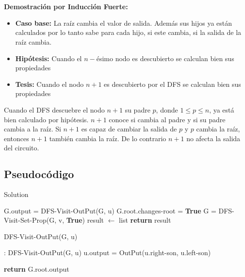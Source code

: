 \documentclass[a4paper,10pt]{article}
\begin{document}
	\\\\\textbf{Demostraci\'on por Inducci\'on Fuerte:} 
	\begin{itemize}
		\item \textbf{Caso base:} La ra\'iz cambia el valor de salida. Adem\'as sus hijos ya est\'an calculados por lo tanto sabe para cada hijo, si este cambia, si la salida  de la ra\'iz cambia.
		\item \textbf{Hip\'otesis:} Cuando el $n-$\'esimo nodo es descubierto se calculan bien sus propiedades
		\item \textbf{Tesis:} Cuando el nodo $n + 1$ es descubierto por el DFS se calculan bien sus propiedades
	\end{itemize}
	Cuando el DFS descuebre el nodo $n + 1$ su padre $p$, donde $1 \leq p \leq n$, ya est\'a bien calculado por hip\'otesis. $n+1$ conoce si cambia al padre y si su padre cambia a la ra\'iz. Si $n+1$ es capaz de cambiar la salida de $p$ y $p$ cambia la ra\'iz, entonces $n+1$ tambi\'en cambia la ra\'iz. De lo contrario $n + 1$ no afecta la salida del circuito.
	
	\subsection{Pseudoc\'odigo}
	\begin{algorithm}[H] 
	\caption{Solution}
		\begin{algorithmic}[1]
			\State G.output = DFS-Visit-OutPut(G, u)
			\State G.root.changes-root = \textbf{True}
			\State G = DFS-Visit-Set-Prop(G, v, \textbf{True})
			\State result $\gets$ list
				\EndIf 
			\EndFor
			\State \textbf{return} result
		\end{algorithmic}
	\end{algorithm}
	
	\begin{algorithm}[H] 
		\caption{DFS-Visit-OutPut(G, u)}
		\begin{algorithmic}[1]
			:
			\State DFS-Visit-OutPut(G, u)
			\State u.output = OutPut(u.right-son, u.left-son) 
			\EndIf
			\EndFor
			
			\State \textbf{return} G.root.output
			
		\end{algorithmic}
	\end{algorithm}
	
\end{document}
